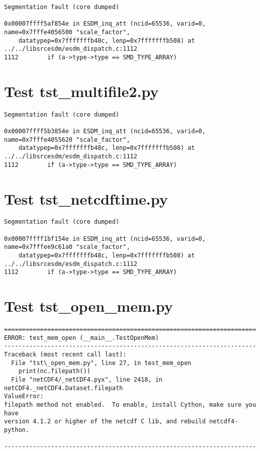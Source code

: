 \begin{verbatim}
Segmentation fault (core dumped)

0x00007ffff5af854e in ESDM_inq_att (ncid=65536, varid=0, name=0x7fffe4056500 "scale_factor",
    datatypep=0x7fffffffb48c, lenp=0x7fffffffb508) at ../../libsrcesdm/esdm_dispatch.c:1112
1112	    if (a->type->type == SMD_TYPE_ARRAY)
\end{verbatim}

\section{Test tst\_multifile2.py}

\begin{verbatim}
Segmentation fault (core dumped)

0x00007ffff5b3854e in ESDM_inq_att (ncid=65536, varid=0, name=0x7fffe4055620 "scale_factor",
    datatypep=0x7fffffffb48c, lenp=0x7fffffffb508) at ../../libsrcesdm/esdm_dispatch.c:1112
1112	    if (a->type->type == SMD_TYPE_ARRAY)
\end{verbatim}

\section{Test tst\_netcdftime.py}

\begin{verbatim}
Segmentation fault (core dumped)

0x00007ffff1bf154e in ESDM_inq_att (ncid=65536, varid=0, name=0x7fffee9c61a0 "scale_factor",
    datatypep=0x7fffffffb48c, lenp=0x7fffffffb508) at ../../libsrcesdm/esdm_dispatch.c:1112
1112	    if (a->type->type == SMD_TYPE_ARRAY)
\end{verbatim}

\section{Test tst\_open\_mem.py}

\begin{verbatim}
======================================================================
ERROR: test_mem_open (__main__.TestOpenMem)
----------------------------------------------------------------------
Traceback (most recent call last):
  File "tst\_open_mem.py", line 27, in test_mem_open
    print(nc.filepath())
  File "netCDF4/_netCDF4.pyx", line 2418, in netCDF4._netCDF4.Dataset.filepath
ValueError:
filepath method not enabled.  To enable, install Cython, make sure you have
version 4.1.2 or higher of the netcdf C lib, and rebuild netcdf4-python.

----------------------------------------------------------------------
\end{verbatim}

